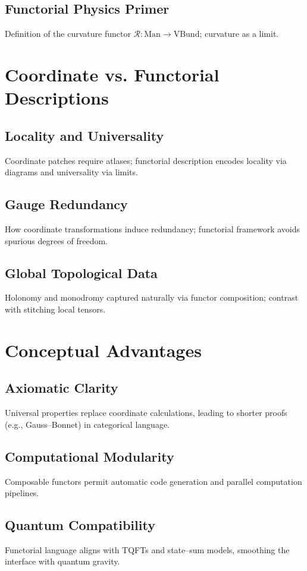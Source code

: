 \documentclass[11pt]{article}
\begin{document}
\subsection{Functorial Physics Primer}
Definition of the curvature functor $\mathcal{R}:\mathrm{Man}\to\mathrm{VBund}$; curvature as a limit.

\section{Coordinate vs. Functorial Descriptions}
\subsection{Locality and Universality}
Coordinate patches require atlases; functorial description encodes locality via diagrams and universality via limits.
\subsection{Gauge Redundancy}
How coordinate transformations induce redundancy; functorial framework avoids spurious degrees of freedom.
\subsection{Global Topological Data}
Holonomy and monodromy captured naturally via functor composition; contrast with stitching local tensors.

\section{Conceptual Advantages}
\subsection{Axiomatic Clarity}
Universal properties replace coordinate calculations, leading to shorter proofs (e.g., Gauss--Bonnet) in categorical language.
\subsection{Computational Modularity}
Composable functors permit automatic code generation and parallel computation pipelines.
\subsection{Quantum Compatibility}
Functorial language aligns with TQFTs and state--sum models, smoothing the interface with quantum gravity.
\end{document}
